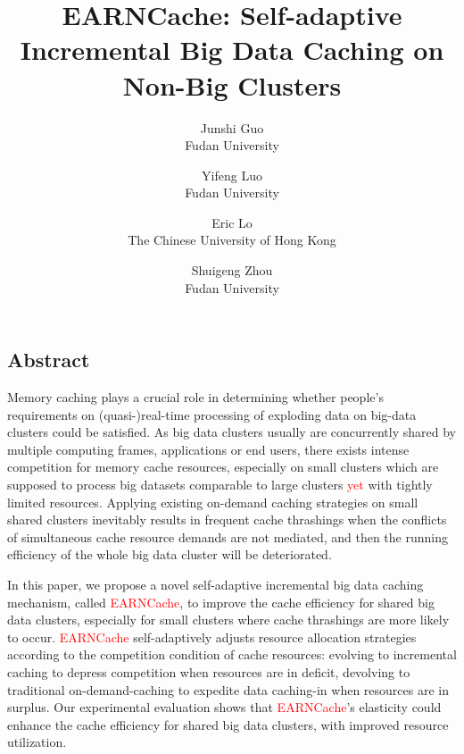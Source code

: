 \documentclass[letterpaper,twocolumn,10pt]{article}
\begin{document}
\date{}

\title{\Large \bf EARNCache: Self-adaptive Incremental Big Data Caching on Non-Big Clusters}

\author{
{\rm Junshi Guo}\\
Fudan University
\and
{\rm Yifeng Luo}\\
Fudan University
\and
{\rm Eric Lo}\\
The Chinese University of Hong Kong
\and
{\rm Shuigeng Zhou}\\
Fudan University
} %

\maketitle

\thispagestyle{empty}


\subsection*{Abstract}
Memory caching plays a crucial role in determining whether people's requirements on (quasi-)real-time processing of exploding data on big-data clusters could be satisfied. As big data clusters usually are concurrently shared by multiple computing frames, applications or end users, there exists intense competition for memory cache resources, especially on small clusters which are supposed to process big datasets comparable to large clusters \textcolor{red}{yet} with tightly limited resources. Applying existing on-demand caching strategies on small shared clusters inevitably results in frequent cache thrashings when the conflicts of simultaneous cache resource demands are not mediated, and then the running efficiency of the whole big data cluster will be deteriorated.

In this paper, we propose a novel self-adaptive incremental big data caching mechanism, called \textcolor{red}{EARNCache}, to improve the cache efficiency for shared big data clusters, especially for small clusters where cache thrashings are more likely to occur. \textcolor{red}{EARNCache} self-adaptively adjusts resource allocation strategies according to the competition condition of cache resources: evolving to incremental caching to depress competition when resources are in deficit, devolving to traditional on-demand-caching to expedite data caching-in when resources are in surplus. Our experimental evaluation shows that \textcolor{red}{EARNCache}'s elasticity could enhance the cache efficiency for shared big data clusters, with improved resource utilization.
\end{document}
